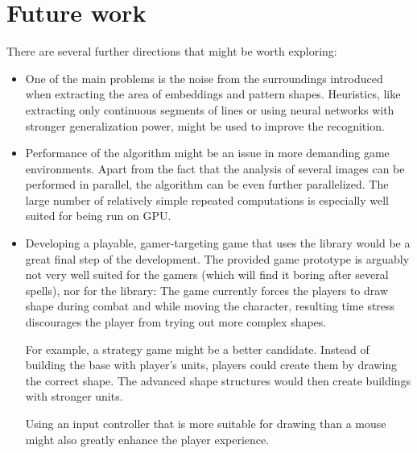\section{Future work}
There are several further directions that might be worth exploring:
\begin{itemize}
\item One of the main problems is the noise from the surroundings introduced when extracting the area of embeddings and pattern shapes. Heuristics, like extracting only continuous segments of lines or using neural networks with stronger generalization power, might be used to improve the recognition.

\item Performance of the algorithm might be an issue in more demanding game environments. Apart from the fact that the analysis of several images can be performed in parallel, the algorithm can be even further parallelized. The large number of relatively simple repeated computations is especially well suited for being run on GPU.

\item Developing a playable, gamer-targeting game that uses the library would be a great final step of the development. The provided game prototype is arguably not very well suited for the gamers (which will find it boring after several spells), nor for the library: The game currently forces the players to draw shape during combat and while moving the character, resulting time stress discourages the player from trying out more complex shapes.

For example, a strategy game might be a better candidate. Instead of building the base with player's units, players could create them by drawing the correct shape. The advanced shape structures would then create buildings with stronger units.

Using an input controller that is more suitable for drawing than a mouse might also greatly enhance the player experience.
\end{itemize}
